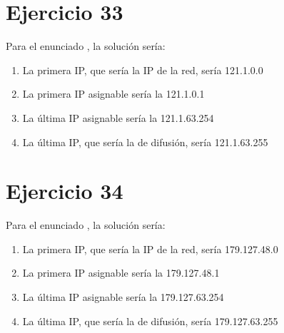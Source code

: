 \documentclass[letterpaper,10pt,spanish]{sphinxmanual}
\begin{document}
\section{Ejercicio 33}
\label{\detokenize{t2_integracion_elementos/ejercicios_subredes_ipv4/rangos_direcciones:id33}}
\sphinxAtStartPar
Para el enunciado , la solución sería:
\begin{enumerate}
%
\item {} 
\sphinxAtStartPar
La primera IP, que sería la IP de la red, sería 121.1.0.0

\item {} 
\sphinxAtStartPar
La primera IP asignable sería la 121.1.0.1

\item {} 
\sphinxAtStartPar
La última IP asignable sería la 121.1.63.254

\item {} 
\sphinxAtStartPar
La última IP, que sería la de difusión, sería 121.1.63.255

\end{enumerate}


\section{Ejercicio 34}
\label{\detokenize{t2_integracion_elementos/ejercicios_subredes_ipv4/rangos_direcciones:id34}}
\sphinxAtStartPar
Para el enunciado , la solución sería:
\begin{enumerate}
%
\item {} 
\sphinxAtStartPar
La primera IP, que sería la IP de la red, sería 179.127.48.0

\item {} 
\sphinxAtStartPar
La primera IP asignable sería la 179.127.48.1

\item {} 
\sphinxAtStartPar
La última IP asignable sería la 179.127.63.254

\item {} 
\sphinxAtStartPar
La última IP, que sería la de difusión, sería 179.127.63.255

\end{enumerate}
\end{document}
